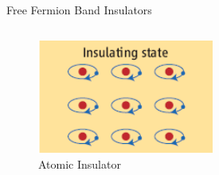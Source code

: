 \begin{frame}{Free Fermion Band Insulators}
\begin{columns}[T]
\begin{column}[T]{0.35\textwidth}
{\begin{figure}
        \includegraphics[width=\linewidth]{diagrams/bernevig1.png}
        \caption{Atomic Insulator}
    \end{figure}
}
\end{column}
\end{columns}
\end{frame}